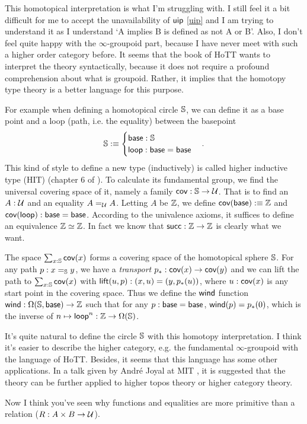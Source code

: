 This homotopical interpretation is what I'm struggling with. I still
feel it a bit difficult for me to accept the unavailability of $\text{\sf uip}$
\eqref{uip} and I am trying to understand it as I understand `A implies B
is defined as not A or B'. Also, I don't feel quite happy with the
$\infty$-groupoid part, because I have never meet with such a higher
order category before. It seems that the book of HoTT\cite{homotopy-type-theory} 
wants to interpret the theory syntactically, because it does not require a 
profound comprehension about what is groupoid. Rather, it implies that the
homotopy type theory is a better language for this purpose. 

For example when defining a homotopical circle $\mathbb{S}$, we can define 
it as a base point and a loop (path, i.e. the equality) between the 
basepoint
\newcommand{\base}{\name{base}}
\newcommand{\nloop}{\name{loop}}
$$
    \sphere\defn\begin{cases}
        \base: \sphere \\
        \nloop: \base=\base \\
    \end{cases}.
$$
This kind of style to define a new type (inductively) is called higher
inductive type (HIT) (chapter 6 of \cite{homotopy-type-theory}).
To calculate its fundamental group, we find the universal covering space 
of it, namely a family $\text{\sf cov}:\mathbb{S}\to\mathcal{U}$. That is to
find an $A: \mathcal{U}$ and an equality $A=_{\mathcal{U}} A$. Letting $A$
be $\mathbb{Z}$, we define $\name{cov}(\base)\defn\integer$ and 
$\name{cov}(\nloop):\base=\base$. According to the univalence axioms,
it suffices to define an equivalence $\mathbb{Z}\simeq\mathbb{Z}$. In fact
we know that $\text{\sf succ}: \mathbb{Z}\to\mathbb{Z}$ is clearly what we want.

The space $\sum_{x:\mathbb{S}}\text{\sf cov}(x)$ forms a covering space of
the homotopical sphere $\mathbb{S}$. For any path $p:x=_{\mathbb{S}} y$,
we have a {\it transport} $p_\ast:\text{\sf cov}(x)\to \text{\sf cov}(y)$ and
we can lift the path to $\sum_{x:\mathbb{S}}\text{\sf cov}(x)$ with
\newcommand{\lift}{\name{lift}}
$\lift(u,p):(x,u)=(y,p_\ast(u))$, where $u: \text{\sf cov}(x)$ is any
start point in the covering space. Thus we define the $\text{\sf wind}$
function $\name{wind}: \Omega(\sphere,\base)\to\integer$ such that
for any $p:\base=\base$, $\text{\sf wind}(p)=p_\ast(0)$, which is the
inverse of $n\mapsto \nloop^n: \integer\to\Omega(\sphere)$.

It's quite natural to define the circle $\mathbb{S}$ with this homotopy
interpretation. I think it's easier to describe the higher category,
e.g. the fundamental $\infty$-groupoid with the language of HoTT. 
Besides, it seems that this language has some other applications.
In a talk given by Andr\'e Joyal at MIT \cite{joyal2014categorical}, 
it is suggested that the theory can be further applied to higher topos 
theory or higher category theory.

Now I think you've seen why functions and equalities are more
primitive than a relation ($R:A\times B\to \mathcal{U}$).
